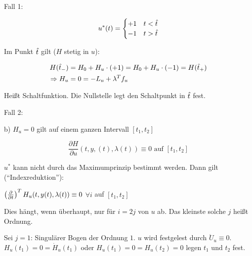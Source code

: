 Fall 1:

\[ u^*(t) = \begin{cases} +1 & t < {\hat t} \\ -1 & t > {\hat t} \end{cases} \]

Im Punkt ${\hat t}$ gilt ($H$ stetig in $u$):

\begin{align*}
H({\hat t}_-) &= H_0 + H_u \cdot (+1) = H_0 + H_u \cdot (-1) = H({\hat t}_+) \\
\Rightarrow H_u &= 0 = -L_u + \lambda^T f_u
\end{align*}

Heißt Schaltfunktion. Die Nullstelle legt den Schaltpunkt in ${\hat t}$ fest.

Fall 2: 

b) $H_u = 0$ gilt auf einem ganzen Intervall $[t_1,t_2]$

\[ \frac{\partial H}{\partial u} (t,y,(t),\lambda(t)) \equiv 0 \text{ auf } [t_1, t_2] \]

$u^*$ kann nicht durch das Maximumprinzip bestimmt werden. Dann gilt ("`Indexreduktion"'):

\bitm
\item $\left( \frac{\partial}{\partial t}\right)^T H_u (t,y(t),\lambda(t)) \equiv 0 $ $\forall i$ auf $[t_1,t_2]$
\item Dies hängt, wenn überhaupt, nur für $i = 2j$ von $u$ ab. Das kleinste solche $j$ heißt Ordnung.
\eitm

Sei \zb $j=1$: Singulärer Bogen der Ordnung $1$. $u$ wird festgelest durch $\ddot U_u \equiv 0$. $H_u(t_1) = 0 = \dot H_u(t_1)$ oder $H_u(t_1) = 0 = H_u(t_2) = 0$ legen $t_1$ und $t_2$ fest.








